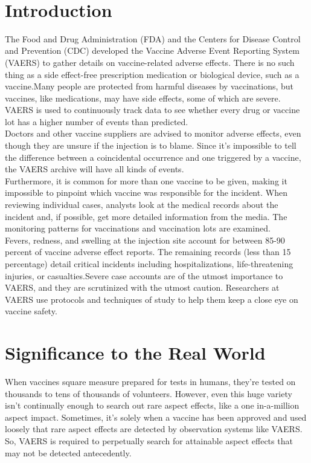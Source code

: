\documentclass[conference]{IEEEtran}
\begin{document}
\\

\section{Introduction}
The Food and Drug Administration (FDA) and the Centers for Disease Control and Prevention (CDC) developed the Vaccine Adverse Event Reporting System (VAERS) to gather details on vaccine-related adverse effects. There is no such thing as a side effect-free prescription medication or biological device, such as a vaccine.Many people are protected from harmful diseases by vaccinations, but vaccines, like medications, may have side effects, some of which are severe. VAERS is used to continuously track data to see whether every drug or vaccine lot has a higher number of events than predicted.\\

Doctors and other vaccine suppliers are advised to monitor adverse effects, even though they are unsure if the injection is to blame. Since it's impossible to tell the difference between a coincidental occurrence and one triggered by a vaccine, the VAERS archive will have all kinds of events.\\

Furthermore, it is common for more than one vaccine to be given, making it impossible to pinpoint which vaccine was responsible for the incident. When reviewing individual cases, analysts look at the medical records about the incident and, if possible, get more detailed information from the media. The monitoring patterns for vaccinations and vaccination lots are examined.\\

Fevers, redness, and swelling at the injection site account for between 85-90 percent of vaccine adverse effect reports. The remaining records (less than 15 percentage) detail critical incidents including hospitalizations, life-threatening injuries, or casualties.Severe case accounts are of the utmost importance to VAERS, and they are scrutinized with the utmost caution. Researchers at VAERS use protocols and techniques of study to help them keep a close eye on vaccine safety.\\

\section{Significance to the Real World}

When vaccines square measure prepared for tests in humans, they're tested on thousands to tens of thousands of volunteers. However, even this huge variety isn't continually enough to search out rare aspect effects, like a one in-a-million aspect impact. Sometimes, it's solely when a vaccine has been approved and used loosely that rare aspect effects are detected by observation systems like VAERS. So, VAERS is required to perpetually search for attainable aspect effects that may not be detected antecedently.\\
\end{document}
